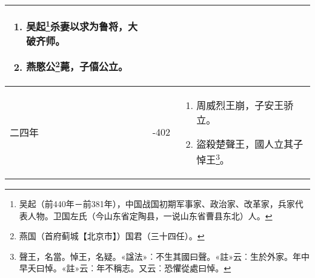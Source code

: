 \begin{longtable}{|>{\centering\scriptsize}m{2em}|>{\centering\scriptsize}m{1.3em}|>{\centering}m{8.8em}|}
\begin{enumerate}
  \item 吴起\footnote{吴起（前440年－前381年），中国战国初期军事家、政治家、改革家，兵家代表人物。卫国左氏（今山东省定陶县，一说山东省曹县东北）人。}杀妻以求为鲁将，大破齐师。
  \item 燕愍公\footnote{燕国（首府蓟城【北京市】）国君（三十四任）。}薨，子僖公立。
  \end{enumerate} \tabularnewline\hline
  二四年 & -402 & \begin{enumerate}
    \tiny
  \item 周威烈王崩，子安王骄立。
  \item 盜殺楚聲王，國人立其子悼王\footnote{聲王，名當。悼王，名疑。«諡法»︰不生其國曰聲。«註»云︰生於外家。年中早夭曰悼。«註»云︰年不稱志。又云︰恐懼從處曰悼。}。
  \end{enumerate} \tabularnewline
  \bottomrule
\end{longtable}

